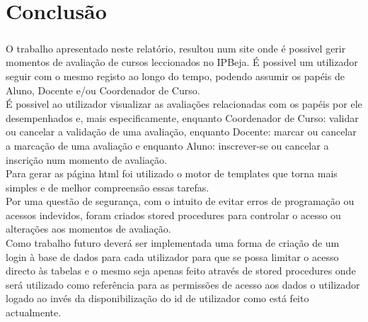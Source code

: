 

\chapter{Conclusão}

\paragraph{}

O trabalho apresentado neste relatório, resultou num site onde é possivel gerir momentos de avaliação de cursos leccionados no IPBeja. É possivel um utilizador seguir com o mesmo registo ao longo do tempo, podendo assumir os papéis de Aluno, Docente e/ou Coordenador de Curso.\\
É possivel ao utilizador visualizar as avaliações relacionadas com os papéis por ele desempenhados e, mais especificamente, enquanto Coordenador de Curso: validar ou cancelar a validação de uma avaliação, enquanto Docente: marcar ou cancelar a marcação de uma avaliação e enquanto Aluno: inscrever-se ou cancelar a inscrição num momento de avaliação.\\
Para gerar as página html foi utilizado o motor de templates  que torna mais simples e de melhor compreensão essas tarefas.\\
Por uma questão de segurança, com o intuito de evitar erros de programação ou acessos indevidos, foram criados stored procedures para controlar o acesso ou alterações aos momentos de avaliação.\\
Como trabalho futuro deverá ser implementada uma forma de criação de um login à base de dados para cada utilizador para que se possa limitar o acesso directo às tabelas e o mesmo seja apenas feito através de stored procedures onde será utilizado como referência para as permissões de acesso aos dados o utilizador logado ao invés da disponibilização do id de utilizador como está feito actualmente.